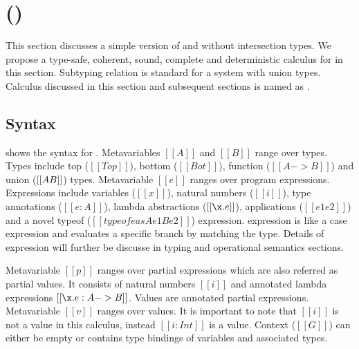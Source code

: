 \section{\name (\cal)}
\label{sec:union}

This section discusses a simple version of \name and without intersection types. We propose a type-safe,
coherent, sound, complete and deterministic calculus for \name in this section. Subtyping relation is
standard for a system with union types. Calculus discussed in this section and subsequent sections is 
named as \cal.


\subsection{Syntax}
\label{sec:union:syntax}
 shows the syntax for \cal. Metavariables $[[A]]$ and $[[B]]$ range over types.
Types include top ($[[Top]]$), bottom ($[[Bot]]$), function ($[[A -> B]]$) and union ($[[A \/ B]]$) types.
Metavariable $[[e]]$ ranges over program expressions. Expressions include variables ($[[x]]$), natural
numbers ($[[i]]$), type annotations ($[[e:A]]$), lambda abstractions ($[[\x.e]]$), applications 
($[[e1 e2]]$) and a novel typeof ($[[typeof e as A e1 B e2]]$) expression. \Typeof expression is 
like a case expression and evaluates a specific branch by matching the type. Details of \typeof 
expression will further be discusse in typing and operational semantics sections.

Metavariable $[[p]]$ ranges over partial expressions which are also referred as partial values.
It consists of natural numbers $[[i]]$ and annotated lambda expressions $[[\x.e : A -> B]]$.
Values are annotated partial expressions. Metavariable $[[v]]$ ranges over values. It is important to
note that $[[i]]$ is not a value in this calculus, instead $[[i:Int]]$ is a value.
Context ($[[G]]$) can either be empty or contains type bindings of variables and associated types. 


